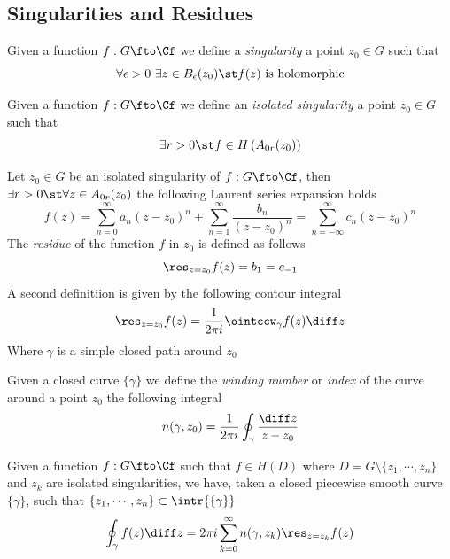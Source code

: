 \documentclass[../mmf.tex]{subfiles}
\begin{document}
\subsection{Singularities and Residues}
\begin{dfn}[Singularity]
	Given a function $f:G\fto\Cf$ we define a \textit{singularity} a point $z_0\in G$ such that
	\begin{equation}
		\forall\epsilon>0\ \exists z\in B_\epsilon(z_0)\st f(z)\text{ is holomorphic}
		\label{eq:singularity1}
	\end{equation}
\end{dfn}
\begin{dfn}
	Given a function $f:G\fto\Cf$ we define an \textit{isolated singularity} a point $z_0\in G$ such that
	\begin{equation}
		\exists r>0\st f\in H\left( A_{0r}(z_0) \right)
		\label{eq:isolatedsing}
	\end{equation}
\end{dfn}
\begin{dfn}[Residue]
	Let $z_0\in G$ be an isolated singularity of $f:G\fto\Cf$, then $\exists r>0\st\forall z\in A_{0r}(z_0)$ the following Laurent series expansion holds
	\begin{equation*}
		f(z)=\sum_{n=0}^{\infty}a_n(z-z_0)^n+\sum_{n=1}^{\infty}\frac{b_n}{(z-z_0)^n}=\sum_{n=-\infty}^{\infty}c_n(z-z_0)^n
	\end{equation*}
	The \textit{residue} of the function $f$ in $z_0$ is defined as follows
	\begin{equation}
		\res_{z=z_0}f(z)=b_1=c_{-1}
		\label{eq:residue}
	\end{equation}
	A second definitiion is given by the following contour integral
	\begin{equation*}
		\res_{z=z_0}f(z)=\frac{1}{2\pi i}\ointccw_\gamma f(z)\diff z
	\end{equation*}
	Where $\gamma$ is a simple closed path around $z_0$
\end{dfn}
\begin{dfn}
	Given a closed curve $\{\gamma\}$ we define the \textit{winding number} or \textit{index} of the curve around a point $z_0$ the following integral
	\begin{equation}
		n(\gamma,z_0)=\frac{1}{2\pi i}\oint_\gamma\frac{\diff z}{z-z_0}
		\label{eq:windingnumber}
	\end{equation}
\end{dfn}
\begin{thm}
	Given a function $f:G\fto\Cf$ such that $f\in H(D)$ where $D=G\setminus\{z_1,\cdots,z_n\}$ and $z_k$ are isolated singularities, we have, taken a closed piecewise smooth curve $\{\gamma\}$, such that $\{z_1,\cdots,z_n\}\subset\intr{\{\gamma\}}$
	\begin{equation}
		\oint_\gamma f(z)\diff z=2\pi i\sum_{k=0}^{\infty}n(\gamma,z_k)\res_{z=z_k}f(z)
		\label{eq:residuetheorem}
	\end{equation}
\end{thm}
\end{document}
